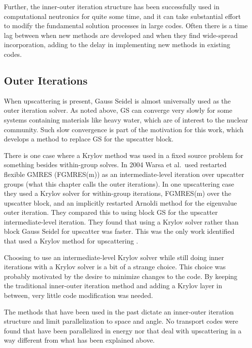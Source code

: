 Further, the inner-outer iteration structure has been successfully used in computational neutronics for quite some time, and it can take substantial effort to modify the fundamental solution processes in large codes. Often there is a time lag between when new methods are developed and when they find wide-spread incorporation, adding to the delay in implementing new methods in existing codes.

\subsection{Outer Iterations}
When upscattering is present, Gauss Seidel is almost universally used as the outer iteration solver. As noted above, GS can converge very slowly for some systems containing materials like heavy water, which are of interest to the nuclear community. Such slow convergence is part of the motivation for this work, which develops a method to replace GS for the upscatter block. 

There is one case where a Krylov method was used in a fixed source problem for something besides within-group solves. In 2004 Warsa et al.\ used restarted flexible GMRES (FGMRES(m)) as an intermediate-level iteration over upscatter groups (what this chapter calls the outer iterations). In one upscattering case they used a Krylov solver for within-group iterations, FGMRES(m) over the upscatter block, and an implicitly restarted Arnoldi method for the eigenvalue outer iteration. They compared this to using block GS for the upscatter intermediate-level iteration. They found that using a Krylov solver rather than block Gauss Seidel for upscatter was faster. This was the only work identified that used a Krylov method for upscattering \cite{Warsa2004a}. 

Choosing to use an intermediate-level Krylov solver while still doing inner iterations with a Krylov solver is a bit of a strange choice. This choice was probably motivated by the desire to minimize changes to the code. By keeping the traditional inner-outer iteration method and adding a Krylov layer in between, very little code modification was needed. 

The methods that have been used in the past dictate an inner-outer iteration structure and limit parallelization to space and angle. No transport codes were found that have been parallelized in energy nor that deal with upscattering in a way different from what has been explained above. 

